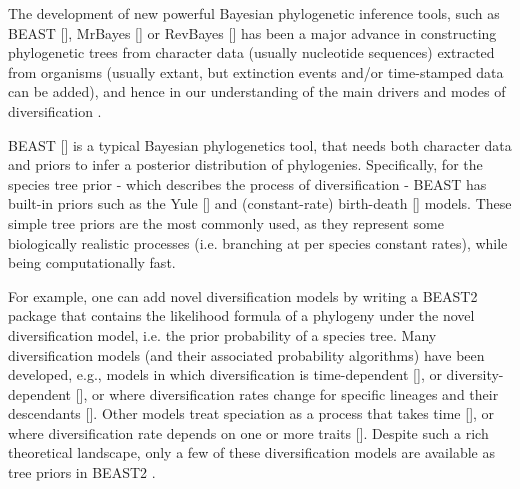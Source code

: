 The development of new powerful Bayesian phylogenetic inference tools, 
such as BEAST [\cite{drummond2007beast}], 
MrBayes [\cite{huelsenbeck2001mrbayes}]
or RevBayes [\cite{hohna2016revbayes}] 
has been a major advance in constructing phylogenetic trees 
from character data (usually nucleotide sequences) extracted
from organisms (usually extant, but extinction events 
and/or time-stamped data can be added), 
and hence in our understanding of the main drivers 
and modes of diversification .


BEAST [\cite{drummond2007beast}] is a typical Bayesian phylogenetics tool, 
that needs both character data and priors to infer 
a posterior distribution of phylogenies.
Specifically, for the species tree prior - which describes 
the process of diversification - 
BEAST has built-in priors such as the Yule [\cite{yule}] and 
(constant-rate) birth-death [\cite{nee1994reconstructed}] models.
These simple tree priors are  the most commonly used, 
as they represent some biologically realistic processes (i.e. 
branching at per species constant rates), while being computationally fast.



For example, one can add novel diversification models 
by writing a BEAST2 package that contains the likelihood 
formula of a phylogeny under the novel diversification model, 
i.e. the prior probability of a species tree.
Many diversification models (and their associated probability algorithms) 
have been developed, e.g., models in which diversification is time-dependent [\cite{nee1994reconstructed,rabosky2008explosive}],
or diversity-dependent [\cite{etienne2012diversity}],
or where diversification rates change for specific lineages 
and their descendants [\cite{etienne2012conceptual, rabosky2014automatic, alfaro2009nine}].
Other models treat speciation as a process that takes 
time [\cite{rosindell2010protracted, etienne2012prolonging, lambert2015reconstructed}],
or where diversification rate
depends on one or more traits [\cite{maddison2007estimating, fitzjohn2012diversitree}].
Despite such a rich theoretical landscape, only a few of these 
diversification models are available as tree priors in BEAST2
.


